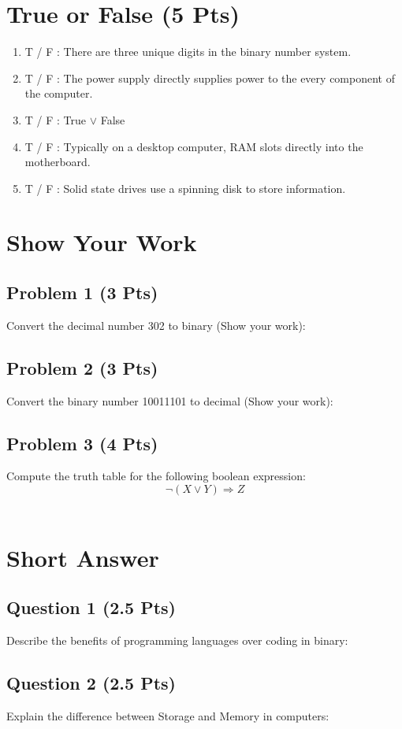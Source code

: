 \documentclass{article}
\begin{document}
\pagestyle{fancy}
\section{True or False (5 Pts)}
\begin{enumerate}
    \item T / F : There are three unique digits in the binary number system.
    \item T / F : The power supply directly supplies power to the every component of the computer.
    \item T / F : True $\lor$ False
    \item T / F : Typically on a desktop computer, RAM slots directly into the motherboard.
    \item T / F : Solid state drives use a spinning disk to store information.
\end{enumerate}

\section{Show Your Work}
\subsection*{Problem 1 (3 Pts)}
Convert the decimal number 302 to binary (Show your work):
\\[3.5in]
\subsection*{Problem 2 (3 Pts)}
Convert the binary number 10011101 to decimal (Show your work):
\newpage
\subsection*{Problem 3 (4 Pts)}
Compute the truth table for the following boolean expression: 
\[
    \lnot (X \lor Y) \Rightarrow  Z
\]
~
\\[3.5in]
\section{Short Answer}
\subsection*{Question 1 (2.5 Pts)}
Describe the benefits of programming languages over coding in binary:

\newpage
\subsection*{Question 2 (2.5 Pts)}
Explain the difference between Storage and Memory in computers:
\end{document}
